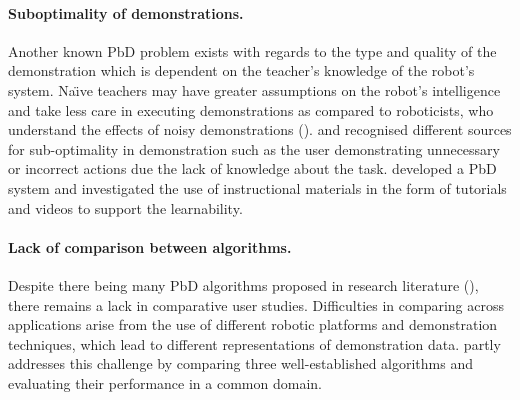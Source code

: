 \paragraph{Suboptimality of demonstrations.}
Another known PbD problem exists with regards to the type and quality of the demonstration which is dependent on the teacher's knowledge of the robot's system.
Na\"{\i}ve teachers may have greater assumptions on the robot's intelligence and take less care in executing demonstrations as compared to roboticists, who understand the effects of noisy demonstrations (\cite{suay2012practical}).
\cite{chen2003programing} and \cite{kaiser1995obtaining} recognised different sources for sub-optimality in demonstration such as the user demonstrating unnecessary or incorrect actions due the lack of knowledge about the task.
\cite{cakmak2014teaching} developed a PbD system and investigated the use of instructional materials in the form of tutorials and videos to support the learnability.

\paragraph{Lack of comparison between algorithms.}
Despite there being many PbD algorithms proposed in research literature (\cite{argall2009survey,billing2010formalism}), there remains a lack in comparative user studies.
Difficulties in comparing across applications arise from the use of different robotic platforms and demonstration techniques, which lead to different representations of demonstration data.
\cite{suay2012practical} partly addresses this challenge by comparing three well-established algorithms and evaluating their performance in a common domain.
